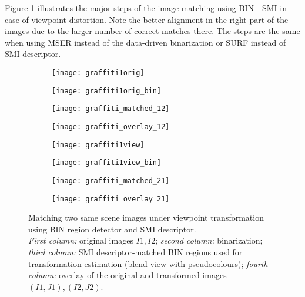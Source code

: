 \documentclass[a4paper,11pt]{article}
\begin{document}
Figure \ref{fig:matching1} illustrates the major steps of the image matching using BIN - SMI in case of viewpoint distortion. Note the better alignment in the right part of the images due to the larger number of correct matches there. The steps are the same when using MSER instead of the data-driven binarization or SURF instead of SMI descriptor.

\begin{figure}[h]
 \vspace{-10pt} 
\begin{center}
\begin{subfigure}[b]{0.22\textwidth}
  \texttt{[image: graffiti1orig]}
\end{subfigure}
\begin{subfigure}[b]{0.22\textwidth}
\texttt{[image: graffiti1orig\_bin]}
\end{subfigure}
\begin{subfigure}[b]{0.22\textwidth}
  \texttt{[image: graffiti\_matched\_12]}
\end{subfigure}
\begin{subfigure}[b]{0.22\textwidth}
\texttt{[image: graffiti\_overlay\_12]}
\end{subfigure}
\end{center}
\vspace{-22pt}
\begin{center}
\begin{subfigure}[b]{0.22\textwidth}
  \texttt{[image: graffiti1view]}
\end{subfigure}
\begin{subfigure}[b]{0.22\textwidth}
\texttt{[image: graffiti1view\_bin]}
\end{subfigure}
\begin{subfigure}[b]{0.22\textwidth}
  \texttt{[image: graffiti\_matched\_21]}
\end{subfigure}
\begin{subfigure}[b]{0.22\textwidth}
\texttt{[image: graffiti\_overlay\_21]}
\end{subfigure}
\end{center}
\vspace{-20pt}
\caption{\footnotesize Matching two same scene images under viewpoint transformation using BIN region detector and SMI descriptor. \\{\em First column:} original images $I1, I2$; {\em second column:} binarization; {\em third column:} SMI descriptor-matched BIN regions used for transformation estimation (blend view with pseudocolours); {\em fourth column:} overlay of the original and transformed images $(I1, J1), (I2, J2)$. }
\label{fig:matching1}
  \vspace{-12pt}
\end{figure}
\end{document}
